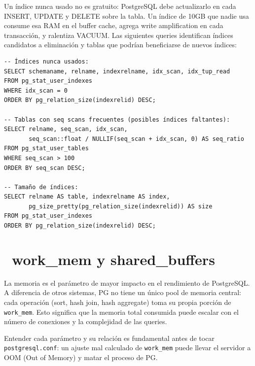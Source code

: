 Un índice nunca usado no es gratuito: PostgreSQL debe actualizarlo en cada INSERT, UPDATE y DELETE sobre la tabla.
Un índice de 10GB que nadie usa consume esa RAM en el buffer cache, agrega write amplification en cada transacción, y ralentiza VACUUM.
Las siguientes queries identifican índices candidatos a eliminación y tablas que podrían beneficiarse de nuevos índices:

\begin{lstlisting}[caption={Detectar índices ineficientes}]
-- Índices nunca usados:
SELECT schemaname, relname, indexrelname, idx_scan, idx_tup_read
FROM pg_stat_user_indexes
WHERE idx_scan = 0
ORDER BY pg_relation_size(indexrelid) DESC;

-- Tablas con seq scans frecuentes (posibles índices faltantes):
SELECT relname, seq_scan, idx_scan,
       seq_scan::float / NULLIF(seq_scan + idx_scan, 0) AS seq_ratio
FROM pg_stat_user_tables
WHERE seq_scan > 100
ORDER BY seq_scan DESC;

-- Tamaño de índices:
SELECT relname AS table, indexrelname AS index,
       pg_size_pretty(pg_relation_size(indexrelid)) AS size
FROM pg_stat_user_indexes
ORDER BY pg_relation_size(indexrelid) DESC;
\end{lstlisting}

\section[work\_mem y shared\_buffers]{~work\_mem y shared\_buffers}

La memoria es el parámetro de mayor impacto en el rendimiento de PostgreSQL.
A diferencia de otros sistemas, PG no tiene un único pool de memoria central: cada operación (sort, hash join, hash aggregate) toma su propia porción de \texttt{work\_mem}.
Esto significa que la memoria total consumida puede escalar con el número de conexiones y la complejidad de las queries.

Entender cada parámetro y su relación es fundamental antes de tocar \texttt{postgresql.conf}: un ajuste mal calculado de \texttt{work\_mem} puede llevar el servidor a OOM (Out of Memory) y matar el proceso de PG.

